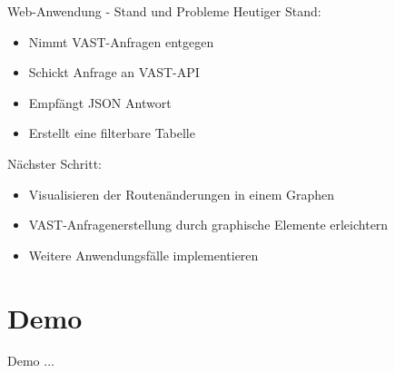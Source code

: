 \documentclass[9pt]{beamer}
\begin{document}
\begin{frame}{Web-Anwendung - Stand und Probleme}
	Heutiger Stand:
	\begin{itemize}
		\item Nimmt VAST-Anfragen entgegen 
		\item Schickt Anfrage an VAST-API
		\item Empfängt JSON Antwort 
		\item Erstellt eine filterbare Tabelle
	\end{itemize}
	Nächster Schritt:
	\begin{itemize}
		\item Visualisieren der Routenänderungen in einem Graphen
		\item VAST-Anfragenerstellung durch graphische Elemente erleichtern
		\item Weitere Anwendungsfälle implementieren
	\end{itemize}
\end{frame}

\section{Demo}

\begin{frame}{Demo}{}
	...
\end{frame}
\end{document}

